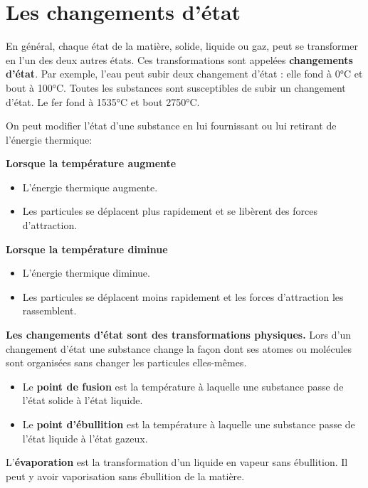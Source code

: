 \documentclass[
  11pt,
  a4paper,
  openany]{book}
\providecommand{\tightlist}{%
  \setlength{\itemsep}{0pt}\setlength{\parskip}{0pt}}
\begin{document}
\section{Les changements d'état}\label{les-changements-duxe9tat}

En général, chaque état de la matière, solide, liquide ou gaz, peut se transformer en l'un des deux autres états. Ces transformations sont appelées \textbf{changements d'état}. Par exemple, l'eau peut subir deux changement d'état : elle fond à 0°C et bout à 100°C. Toutes les substances sont susceptibles de subir un changement d'état. Le fer fond à 1535°C et bout 2750°C.

On peut modifier l'état d'une substance en lui fournissant ou lui retirant de l'énergie thermique:

\textbf{Lorsque la température augmente}

\begin{itemize}
\tightlist
\item
  L'énergie thermique augmente.
\item
  Les particules se déplacent plus rapidement et se libèrent des forces d'attraction.
\end{itemize}

\textbf{Lorsque la température diminue}

\begin{itemize}
\tightlist
\item
  L'énergie thermique diminue.
\item
  Les particules se déplacent moins rapidement et les forces d'attraction les rassemblent.
\end{itemize}

\textbf{Les changements d'état sont des transformations physiques.} Lors d'un changement d'état une substance change la façon dont ses atomes ou molécules sont organisées sans changer les particules elles-mêmes.

\begin{itemize}
\tightlist
\item
  Le \textbf{point de fusion} est la température à laquelle une substance passe de l'état solide à l'état liquide.
\item
  Le \textbf{point d'ébullition} est la température à laquelle une substance passe de l'état liquide à l'état gazeux.
\end{itemize}

L'\textbf{évaporation} est la transformation d'un liquide en vapeur sans ébullition. Il peut y avoir vaporisation sans ébullition de la matière.
\end{document}
